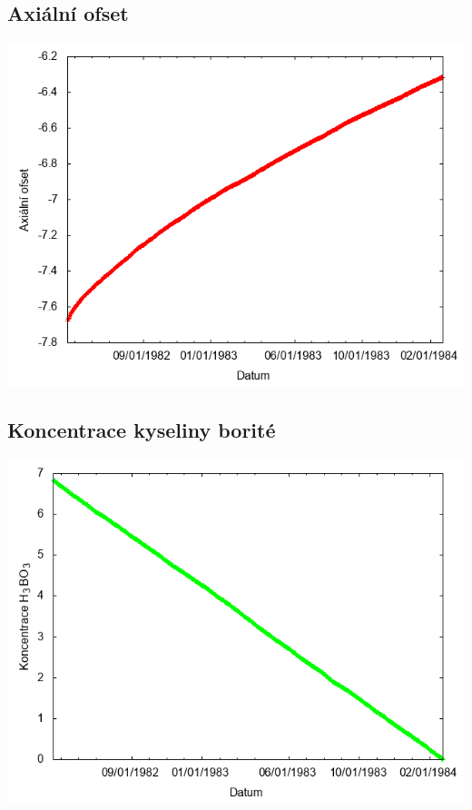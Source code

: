 \documentclass[a4paper,twoside,11pt]{article}
\begin{document}
\subsection*{Axiální ofset}
\begin{center}
\includegraphics[width=.8\textwidth]{graphs/CandyMountain_08_ao.png}
\end{center}

\subsection*{Koncentrace kyseliny borité}
\begin{center}
\includegraphics[width=.8\textwidth]{graphs/CandyMountain_08_bc.png}
\end{center}
\end{document}
